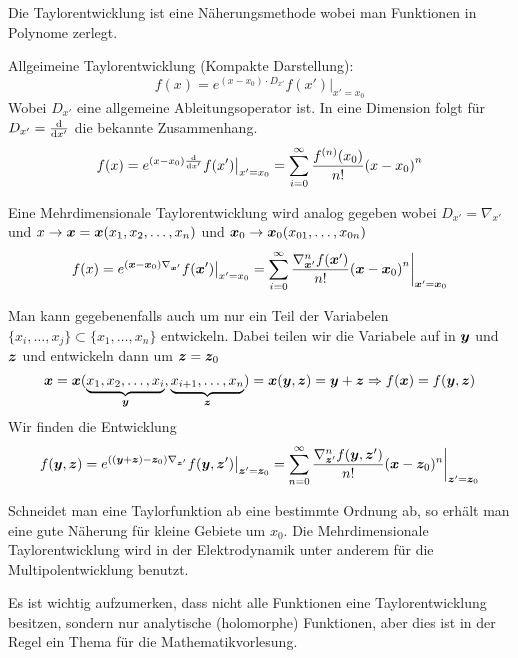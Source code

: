 Die Taylorentwicklung ist eine Näherungsmethode wobei man Funktionen in 
Polynome zerlegt.

Allgeimeine Taylorentwicklung (Kompakte Darstellung):
\begin{equation}
  f(x) = e^{(x - x_0)\cdot D_{x'}}f(x')\big|_{x'=x_0}
\end{equation}
Wobei $D_{x'}$ eine allgemeine Ableitungsoperator ist. In eine Dimension
folgt für $D_{x'}=\dv{x'}$ die bekannte Zusammenhang.
\begin{equation}
  f(x) = e^{(x-x_0)\dv{x'}}f(x')\big|_{x'=x_0} = 
  \sum_{i=0}^{\infty} \frac{f^{(n)}(x_0)}{n!}{(x-x_0)}^n
\end{equation}

Eine Mehrdimensionale Taylorentwicklung wird analog gegeben wobei 
$D_{x'}=\nabla_{x'}$ und $x\to\vb*x = \vb*x(x_1, x_2, \ldots, x_n)$ und
$\vb*x_0\to\vb*x_0(x_{01},\ldots,x_{0n})$ 
\begin{equation}
  f(x) = e^{(\vb*x-\vb*x_0)\nabla_{\vb*x'}}f(\vb*x')\big|_{x'=x_0} = 
  \sum_{i=0}^{\infty} \frac{\nabla_{\vb*x'}^nf(\vb*x')}{n!}
  {(\vb*x-\vb*x_0)}^n\bigg|_{\vb*x'=\vb*x_0}
\end{equation}

Man kann gegebenenfalls auch um nur ein Teil der Variabelen 
$\{x_i,\ldots,x_j\}\subset\{x_1, \ldots, x_n\}$ entwickeln. Dabei teilen
wir die Variabele  auf in $\vb*y$ und $\vb*z$ und entwickeln dann
um $\vb*z=\vb*z_0$
\begin{equation*}
  \vb*x=\vb*x(\underbrace{x_1, x_2,\ldots, x_i}_{\vb*y}, 
  \underbrace{x_{i+1},\ldots, x_{n}}_{\vb*z})=\vb*x(\vb*y, \vb*z) = \vb*y +
  \vb*z
  \Rightarrow f(\vb*x) = f(\vb*y, \vb*z)
\end{equation*}
Wir finden die Entwicklung
\begin{equation}
  f(\vb*y, \vb*z) = e^{\qty((\vb*y + \vb*z) - \vb*z_0)\nabla_{\vb*z'}}
  f(\vb*y, \vb*z')\big|_{\vb*z'=\vb*z_0} = 
  \sum_{n=0}^{\infty} \frac{\nabla^n_{\vb*z'}f(\vb*y,\vb*z')}{n!}
  (\vb*x-\vb*z_0)^n\bigg|_{\vb*z'=\vb*z_0}
\end{equation}

Schneidet man eine Taylorfunktion ab eine bestimmte Ordnung ab, so erhält
man eine gute Näherung für kleine Gebiete um $x_0$. Die Mehrdimensionale
Taylorentwicklung wird in der Elektrodynamik unter anderem für die
Multipolentwicklung benutzt.

Es ist wichtig aufzumerken, dass nicht alle Funktionen eine 
Taylorentwicklung besitzen, sondern nur analytische (holomorphe) 
Funktionen, aber dies ist in der Regel ein Thema für die 
Mathematikvorlesung.
